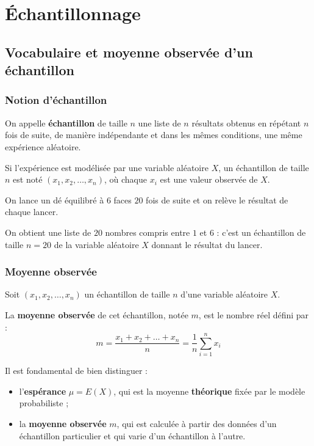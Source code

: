 \chapter{Échantillonnage}

\section{Vocabulaire et moyenne observée d'un échantillon}

\subsection{Notion d'échantillon}

\begin{defin}
	On appelle \textbf{échantillon} de taille $n$ une liste de $n$ résultats obtenus en répétant $n$ fois de suite, de manière indépendante et dans les mêmes conditions, une même expérience aléatoire.

	Si l'expérience est modélisée par une variable aléatoire $X$, un échantillon de taille $n$ est noté $(x_1, x_2, \dots, x_n)$, où chaque $x_i$ est une valeur observée de $X$.
\end{defin}

\begin{ex}
	On lance un dé équilibré à $6$ faces $20$ fois de suite et on relève le résultat de chaque lancer.

	On obtient une liste de $20$ nombres compris entre $1$ et $6$ : c'est un échantillon de taille $n = 20$ de la variable aléatoire $X$ donnant le résultat du lancer.
\end{ex}

\subsection{Moyenne observée}

\begin{defin}
	Soit $(x_1, x_2, \dots, x_n)$ un échantillon de taille $n$ d'une variable aléatoire $X$.

	La \textbf{moyenne observée} de cet échantillon, notée $m$, est le nombre réel défini par :
	\[
		m = \dfrac{x_1 + x_2 + \dots + x_n}{n} = \dfrac{1}{n} \sum_{i=1}^{n} x_i
	\]

\end{defin}

\begin{attention}
	Il est fondamental de bien distinguer :
	\begin{itemize}
		\item l'\textbf{espérance} $\mu = E(X)$, qui est la moyenne \textbf{théorique} fixée par le modèle probabiliste ;
		\item la \textbf{moyenne observée} $m$, qui est calculée à partir des données d'un échantillon particulier et qui varie d'un échantillon à l'autre.
	\end{itemize}
\end{attention}


